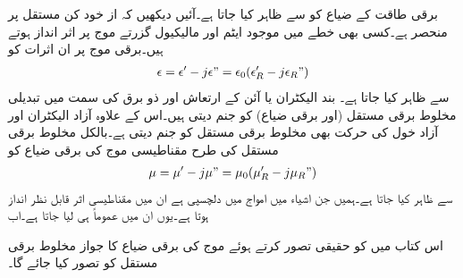 
برقی طاقت کے ضیاع کو  سے ظاہر کیا جاتا ہے۔آئیں دیکھیں کہ  از خود کن مستقل پر منحصر ہے۔کسی بھی خطے میں موجود ایٹم اور مالیکیول گزرتے موج پر اثر انداز ہوتے ہیں۔برقی موج پر ان اثرات کو  
\begin{align*}
\epsilon=\epsilon'-j \epsilon"=\epsilon_0 (\epsilon_R'-j\epsilon_R")
\end{align*}
سے ظاہر کیا جاتا ہے۔ بند الیکٹران یا آئن کے ارتعاش اور ذو برق کی سمت میں تبدیلی مخلوط برقی مستقل (اور برقی ضیاع) کو جنم دیتی ہیں۔اس کے علاوہ آزاد الیکٹران اور آزاد خول کی حرکت بھی مخلوط برقی مستقل کو جنم دیتی ہے۔بالکل مخلوط برقی مستقل کی طرح مقناطیسی موج کی برقی ضیاع کو 
\begin{align*}
\mu=\mu'-j \mu"=\mu_0(\mu_R'-j\mu_R")
\end{align*}
سے  ظاہر کیا جاتا ہے۔ہمیں جن اشیاء میں امواج میں دلچسپی  ہے ان میں مقناطیسی اثر قابل نظر انداز ہوتا ہے۔یوں ان میں عموماً  ہی لیا جاتا ہے۔اب 

اس کتاب میں  کو حقیقی تصور کرتے ہوئے موج کی برقی ضیاع کا جواز مخلوط برقی مستقل کو تصور کیا جائے گا۔ 


